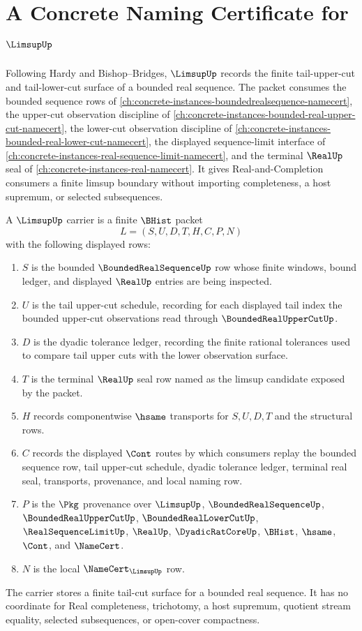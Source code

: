 \chapter{A Concrete Naming Certificate for $\LimsupUp$}
\label{ch:concrete-instances-limsup-namecert}

Following Hardy and Bishop--Bridges, $\LimsupUp$ records the finite tail-upper-cut and tail-lower-cut surface of a bounded real sequence. The packet consumes the bounded sequence rows of \autoref{ch:concrete-instances-boundedrealsequence-namecert}, the upper-cut observation discipline of \autoref{ch:concrete-instances-bounded-real-upper-cut-namecert}, the lower-cut observation discipline of \autoref{ch:concrete-instances-bounded-real-lower-cut-namecert}, the displayed sequence-limit interface of \autoref{ch:concrete-instances-real-sequence-limit-namecert}, and the terminal $\RealUp$ seal of \autoref{ch:concrete-instances-real-namecert}. It gives Real-and-Completion consumers a finite limsup boundary without importing completeness, a host supremum, or selected subsequences.

\begin{definition}
\label{def:limsup-carrier}
A $\LimsupUp$ carrier is a finite $\BHist$ packet
$$
L=(S,U,D,T,H,C,P,N)
$$
with the following displayed rows:
\begin{enumerate}
\item $S$ is the bounded $\BoundedRealSequenceUp$ row whose finite windows, bound ledger, and displayed $\RealUp$ entries are being inspected.
\item $U$ is the tail upper-cut schedule, recording for each displayed tail index the bounded upper-cut observations read through $\BoundedRealUpperCutUp$.
\item $D$ is the dyadic tolerance ledger, recording the finite rational tolerances used to compare tail upper cuts with the lower observation surface.
\item $T$ is the terminal $\RealUp$ seal row named as the limsup candidate exposed by the packet.
\item $H$ records componentwise $\hsame$ transports for $S,U,D,T$ and the structural rows.
\item $C$ records the displayed $\Cont$ routes by which consumers replay the bounded sequence row, tail upper-cut schedule, dyadic tolerance ledger, terminal real seal, transports, provenance, and local naming row.
\item $P$ is the $\Pkg$ provenance over $\LimsupUp$, $\BoundedRealSequenceUp$, $\BoundedRealUpperCutUp$, $\BoundedRealLowerCutUp$, $\RealSequenceLimitUp$, $\RealUp$, $\DyadicRatCoreUp$, $\BHist$, $\hsame$, $\Cont$, and $\NameCert$.
\item $N$ is the local $\NameCert_{\LimsupUp}$ row.
\end{enumerate}
The carrier stores a finite tail-cut surface for a bounded real sequence. It has no coordinate for Real completeness, trichotomy, a host supremum, quotient stream equality, selected subsequences, or open-cover compactness.
\end{definition}

